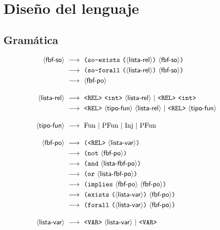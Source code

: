 \section{Diseño del lenguaje}

\subsection{Gramática}
\begin{alignat*}{1}
\sofbf\   & \deriv\ \lpar \SOExists\ \lpar \listrel \rpar\ \sofbf \rpar \\
          & \deriv\ \lpar \SOForall\ \lpar \listrel \rpar\ \sofbf \rpar \\
          & \deriv\ \pofbf \\[1em]
\listrel\ & \deriv\ \rel\ \integer\ \listrel\ |\ \rel\ \integer \\
          & \deriv\ \rel\ \tipof\ \listrel\ |\ \rel\ \tipof\ \\[1em]
\tipof\   & \deriv\ \Fun\ |\ \PFun\ |\ \Inj\ |\ \PInj\ \\[1em]
\pofbf\   & \deriv\ \lpar \rel\ \listvar \rpar \\
          & \deriv\ \lpar \NOT\ \pofbf \rpar \\
          & \deriv\ \lpar \AND\ \listpofbf \rpar \\
          & \deriv\ \lpar \OR\ \listpofbf \rpar \\
          & \deriv\ \lpar \IMPLIES\ \pofbf\ \pofbf \rpar \\
          & \deriv\ \lpar \Exists\ \lpar \listvar \rpar\ \pofbf \rpar \\
          & \deriv\ \lpar \Forall\ \lpar \listvar \rpar\ \pofbf \rpar \\[1em]
\listvar\ & \deriv\ \var\ \listvar\ |\ \var \\[1em]
\end{alignat*}


%
%
%
